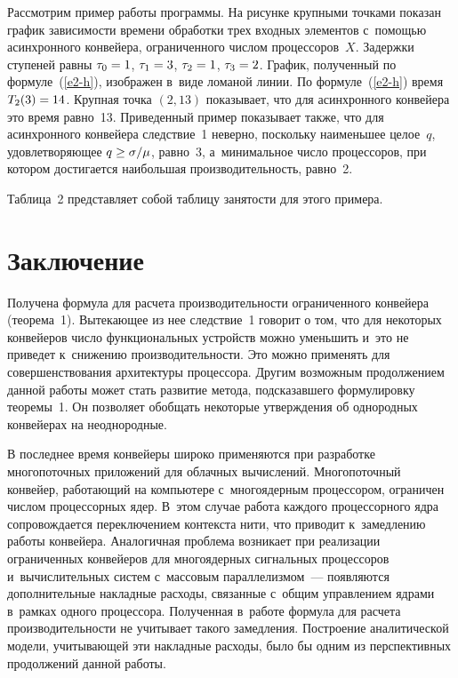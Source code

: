 \begin{multicols}{2}
  Рассмотрим пример работы программы. На рисунке крупными точками 
показан график зависимости времени обработки трех входных элементов 
с~по\-мощью асинхронного конвейера, ограниченного числом 
процессоров~$X$. Задержки ступеней равны $\tau_0\hm=1$, $\tau_1\hm=3$, 
$\tau_2\hm=1$, $\tau_3\hm=2$. График, полученный по формуле~(\ref{e2-h}), 
изображен в~виде ломаной линии. По формуле~(\ref{e2-h}) время 
$T_2(3)\hm=14$. Крупная точка $(2,13)$ показывает, что для асинхронного 
конвейера это время равно~13. Приведенный пример показывает также, что 
для асинхронного конвейера следствие~1 неверно, поскольку наименьшее 
целое~$q$, удовлетворяющее $q\hm\geq \sigma/\mu$, равно~3, 
а~минимальное число процессоров, при котором достигается наибольшая 
производительность, равно~2.
  


  Таблица~2 представляет собой таблицу занятости для этого примера.
  
\vspace*{-6pt}

\section{Заключение}

  Получена формула для расчета производительности ограниченного 
конвейера (теорема~1). Вытекающее из нее следствие~1 говорит о том, что\linebreak 
для некоторых конвейеров число функциональных устройств можно 
уменьшить и~это не приведет к~снижению производительности. Это \mbox{можно} 
применять для совершенствования архитектуры процес\-со\-ра. Другим 
возможным продолжением данной работы может стать развитие метода, 
подсказавшего формулировку теоремы~1. Он позволяет обобщать 
некоторые утверждения об однородных конвейерах на неоднородные. 
  
  В последнее время конвейеры широко применяются при разработке 
многопоточных приложений для облачных вычислений. Многопоточный 
конвейер, работающий на компьютере с~многоядерным процессором, 
ограничен числом процессорных ядер. В~этом случае работа каждого 
процессорного ядра сопровождается переключением контекста нити, что 
приводит к~замедлению работы конвейера. Аналогичная проблема 
возникает при реализации ограниченных конвейеров для многоядерных 
сигнальных процессоров и~вы\-чис\-ли\-тель\-ных сис\-тем с~массовым 
параллелизмом~--- появляются дополнительные накладные расходы, 
связанные с~общим управ\-ле\-ни\-ем ядрами в~рамках одного процессора. 
Полученная в~работе формула для расчета производительности не 
учитывает такого замедления. Построение аналитической модели, 
учитывающей эти накладные расходы, было бы одним из перспективных 
продолжений данной работы.


\end{multicols}
